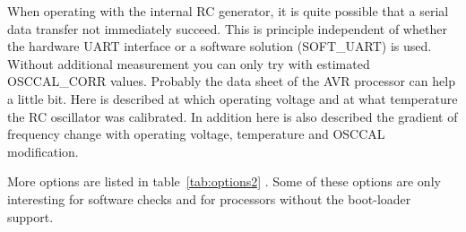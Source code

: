 When operating with the internal RC generator, it is quite possible that a serial data transfer
not immediately succeed. This is principle independent of whether the hardware UART interface
or a software solution (SOFT\_UART) is used.
Without additional measurement you can only try with estimated OSCCAL\_CORR values.
Probably the data sheet of the AVR processor can help a little bit.
Here is described at which operating voltage and at what temperature the RC oscillator
was calibrated. 
In addition here is also described the gradient of frequency change with operating voltage,
temperature and OSCCAL modification.

More options are listed in table~\ref{tab:options2} . 
Some of these options are only interesting for software checks and
for processors without the boot-loader support.

